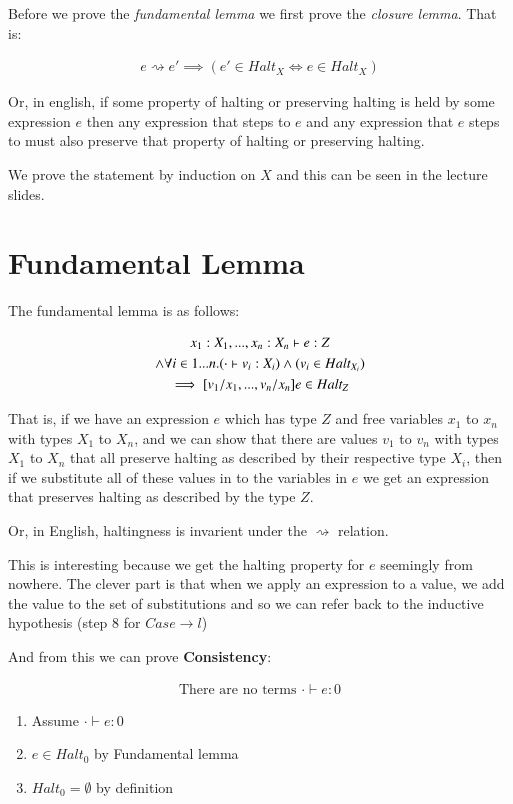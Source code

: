 \documentclass{article}
\newcommand{\inlineeq}[1]{
    \vspace{-2em}
    \begin{gather*}
    #1
    \end{gather*}
    \vspace{-2em}
}
\begin{document}
Before we prove the \textit{fundamental lemma} we first prove the \textit{closure lemma}. That is:

\inlineeq{
e \rightsquigarrow e' \implies (e' \in Halt_X \iff e \in Halt_X)
}

Or, in english, if some property of halting or preserving halting is held by some expression $e$ then any expression that steps to $e$ and any expression that $e$ steps to must also preserve that property of halting or preserving halting.

We prove the statement by induction on $X$ and this can be seen in the lecture slides.

\section{Fundamental Lemma}

The fundamental lemma is as follows:

\inlineeq{
x_1 : X_1, . . ., x_n : X_n \vdash e : Z\\
\land \space \space \forall i \in  {1 . . . n}. (\cdot \vdash v_i : X_i) \land (v_i \in  Halt_{X_i}) \\
\implies [v_1/x_1, . . ., v_n/x_n]e \in  Halt_Z
}

That is, if we have an expression $e$ which has type $Z$ and free variables $x_1$ to $x_n$ with types $X_1$ to $X_n$, and we can show that there are values $v_1$ to $v_n$ with types $X_1$ to $X_n$ that all preserve halting as described by their respective type $X_i$, then if we substitute all of these values in to the variables in $e$ we get an expression that preserves halting as described by the type $Z$.

Or, in English, haltingness is invarient under the $\rightsquigarrow$ relation.

This is interesting because we get the halting property for $e$ seemingly from nowhere. The clever part is that when we apply an expression to a value, we add the value to the set of substitutions and so we can refer back to the inductive hypothesis (step 8 for $Case \to l$)

And from this we can prove \textbf{Consistency}:

\inlineeq{
\textrm{There are no terms }\cdot  \vdash e : 0
}

\begin{enumerate}
\item Assume $\cdot  \vdash e : 0$
\item $e \in  Halt_0$ by Fundamental lemma
\item $Halt_0 = \emptyset $ by definition
\end{enumerate}
\end{document}
